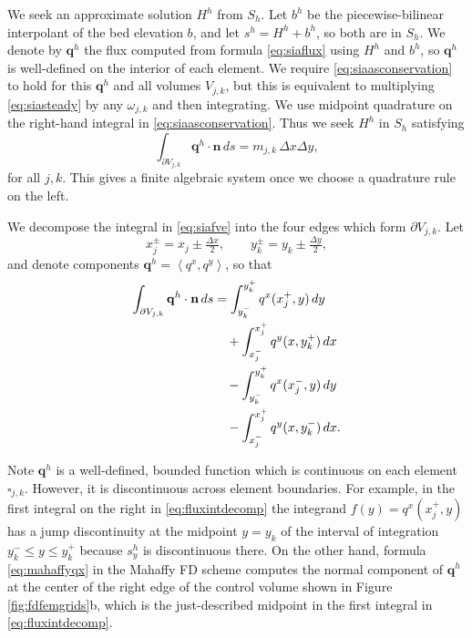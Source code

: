 \documentclass[twocolumn,letterpaper]{igs}
\newcommand\bn{\mathbf{n}}
\newcommand\bq{\mathbf{q}}
\newcommand{\ip}[2]{\ensuremath{\left<#1,#2\right>}}
\newcommand{\dxtwo}{\tfrac{\Delta x}{2}}
\newcommand{\dytwo}{\tfrac{\Delta y}{2}}
\begin{document}
We seek an approximate solution $H^h$ from $S_h$.  Let $b^h$ be the piecewise-bilinear interpolant of the bed elevation $b$, and let $s^h=H^h+b^h$, so both are in $S_h$.  We denote by $\bq^h$ the flux computed from formula \eqref{eq:siaflux} using $H^h$ and $b^h$, so $\bq^h$ is well-defined on the interior of each element.  We require \eqref{eq:siaasconservation} to hold for this $\bq^h$ and all volumes $V_{j,k}$, but this is equivalent to multiplying \eqref{eq:siasteady} by any $\omega_{j,k}$ and then integrating.  We use midpoint quadrature on the right-hand integral in \eqref{eq:siaasconservation}.  Thus we seek $H^h$ in $S_h$ satisfying
\begin{equation}
  \int_{\partial V_{j,k}} \bq^h \cdot \bn\,ds = m_{j,k}\, \Delta x \Delta y, \label{eq:siafve}
\end{equation}
for all $j,k$.  This gives a finite algebraic system once we choose a quadrature rule on the left.

We decompose the integral in \eqref{eq:siafve} into the four edges which form $\partial V_{j,k}$.  Let
\begin{equation}
x_j^\pm = x_j \pm \dxtwo, \qquad y_k^\pm = y_k \pm \dytwo, \label{eq:definexypm}
\end{equation}
and denote components $\bq^h = \ip{q^x}{q^y}$, so that
\begin{align}
\int_{\partial V_{j,k}} \bq^h \cdot \bn\,ds &= \int_{y_k^-}^{y_k^+} q^x(x_j^+,y)\,dy \label{eq:fluxintdecomp} \\
&\quad + \int_{x_j^-}^{x_j^+} q^y(x,y_k^+)\,dx \notag \\
&\quad - \int_{y_k^-}^{y_k^+} q^x(x_j^-,y)\,dy \notag \\
&\quad - \int_{x_j^-}^{x_j^+} q^y(x,y_k^-)\,dx. \notag
\end{align}

Note $\bq^h$ is a well-defined, bounded function which is continuous on each element $\square_{j,k}$.  However, it is discontinuous across element boundaries.  For example, in the first integral on the right in \eqref{eq:fluxintdecomp} the integrand $f(y) = q^x(x_j^+,y)$ has a jump discontinuity at the midpoint $y=y_k$ of the interval of integration $y_k^- \le y \le y_k^+$ because $s^h_y$ is discontinuous there.  On the other hand, formula \eqref{eq:mahaffyqx} in the Mahaffy FD scheme computes the normal component of $\bq^h$ at the center of the right edge of the control volume shown in Figure \ref{fig:fdfemgrids}b, which is the just-described midpoint in the first integral in \eqref{eq:fluxintdecomp}.
\end{document}
